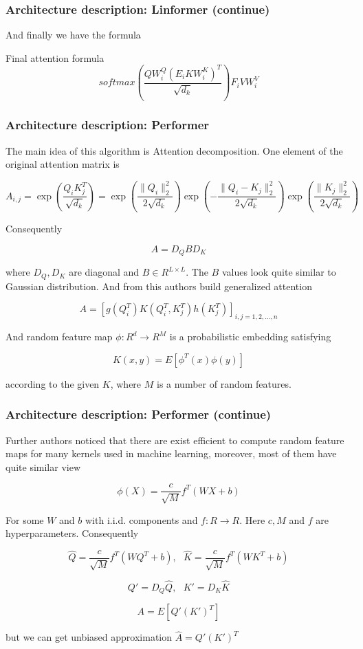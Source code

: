 \documentclass[9pt]{beamer}%
\begin{document}
\begin{frame}
	\frametitle{Architecture description: Linformer (continue)}
	
	And finally we have the formula
	
	\begin{block}{Final attention formula}
		\[ softmax \left( \frac{QW_i^Q (E_iKW_i^K)^T}{\sqrt{d_k}} \right) F_iVW_i^V \]
	\end{block}
	
\end{frame}

\begin{frame}
	\frametitle{Architecture description: Performer}
	
	The main idea of this algorithm is Attention decomposition. One element of the original attention matrix is
	
	\[ A_{i,j} = \exp\left(\frac{Q_i K_j^T}{\sqrt{d_k}}\right) = \exp \left( \frac{\|Q_i\|_2^2}{2\sqrt{d_k}} \right) \exp \left( -\frac{\|Q_i - K_j\|_2^2}{2\sqrt{d_k}} \right) \exp \left( \frac{\|K_j\|_2^2}{2\sqrt{d_k}} \right) \]
	
	Consequently
	
	\[ A = D_Q B D_K \]
	
	where $D_Q, D_K$ are diagonal and $B \in R^{L \times L}$. The $B$ values look quite similar to Gaussian distribution. And from this authors build generalized attention
	
	\[ A = [g(Q_i^T)K(Q_i^T, K_j^T)h(K_j^T)]_{i,j=1, 2, ..., n} \]
	
	And random feature map $\phi : R^d \rightarrow R^M$ is a probabilistic embedding satisfying
	
	\[ K(x, y) = E [\phi^T(x)\phi(y)] \]  
	
	according to the given $K$, where $M$ is a number of random features.
	
\end{frame}

\begin{frame}
	\frametitle{Architecture description: Performer (continue)}
	
	Further authors noticed that there are exist efficient to compute random feature maps for many kernels used in machine learning, moreover, most of them have quite similar view
	
	\[ \phi(X) = \frac{c}{\sqrt{M}} f^T\left( WX + b \right) \]
	
	For some $W$ and $b$ with i.i.d. components and $f: R \rightarrow R$. Here $c, M$ and $f$ are hyperparameters. Consequently
	
	\[ \hat{Q} = \frac{c}{\sqrt{M}} f^T\left( WQ^T + b \right), \text{    } \hat{K} = \frac{c}{\sqrt{M}} f^T\left( WK^T + b \right) \]
	
	\[ Q' = D_Q \hat{Q}, \text{    } K' = D_K \hat{K} \]
	
	\[ A = E[Q'(K')^T] \]
	
	but we can get unbiased approximation $\hat{A} = Q'(K')^T$
	
\end{frame}
\end{document}
